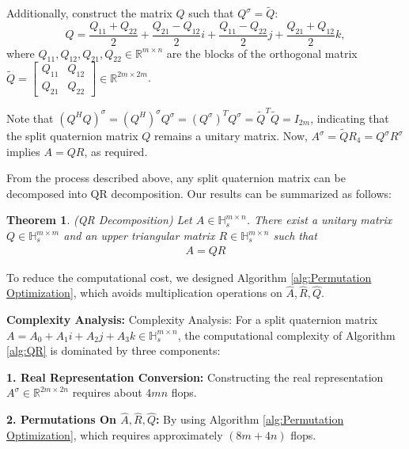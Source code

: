 \documentclass[1p]{elsarticle}
\newtheorem{theorem}{Theorem}[section]
\numberwithin{equation}{section}
\begin{document}
\begin{algorithm}[htbp]
\begin{itemize}
\begin{algorithmic}
\end{algorithmic}
\end{itemize}
\end{algorithm}

Additionally, construct the matrix $Q$ such that $Q^\sigma=\widetilde{Q}:$
$$
Q = \frac{Q_{11} + Q_{22}}{2} + \frac{Q_{21} - Q_{12}}{2}i + \frac{Q_{11} - Q_{22}}{2}j + \frac{Q_{21} + Q_{12}}{2}k,
$$
where  $Q_{11}, 
 Q_{12}, Q_{21}, Q_{22} \in \mathbb{R}^{m \times n}$ are the blocks of the orthogonal matrix $\widetilde{Q} = \begin{bmatrix} Q_{11} & Q_{12} \\ Q_{21} & Q_{22} \end{bmatrix} \in \mathbb{
 R}^{2m \times 2m}$.

Note that $(Q^H Q)^\sigma = {(Q^H)}^\sigma Q^\sigma = {(Q^\sigma)}^TQ^\sigma = \widetilde{Q}^T\widetilde{Q} = I_{2m}$, indicating that the split quaternion matrix $Q$ remains a unitary matrix.
Now, $A^\sigma=\widetilde{Q}R_4=Q^\sigma R^\sigma$ implies
$A = Q R$, as required.

From the process described above,  any split quaternion matrix can be decomposed into QR decomposition. Our results can be summarized as follows:
\begin{theorem}(QR Decomposition)
    Let $A \in \mathbb{H}_s^{m \times n}$. There exist a unitary matrix $Q \in \mathbb{H}_s^{m \times m}$ and an upper triangular matrix $R \in \mathbb{H}_s^{m \times n}$ such that
    \begin{eqnarray}\label{eq:split QR}
        A = Q R
    \end{eqnarray}
\end{theorem}


To reduce the computational cost, we designed Algorithm \ref{alg:Permutation Optimization}, which avoids multiplication operations on $\widehat{A}, \widehat{R}, \widehat{Q}$.

\textbf{Complexity Analysis:}
{Complexity Analysis:} For a split quaternion matrix $A = A_0 + A_1i + A_2j + A_3k \in \mathbb{H}_s^{m \times n}$, the computational complexity of Algorithm \ref{alg:QR} is dominated by three components:  

\textbf{1. Real Representation Conversion:}
Constructing the real representation $A^\sigma \in \mathbb{R}^{2m \times 2n}$ requires about $4mn$ flops. 

\textbf{2. Permutations On $\widehat{A}, \widehat{R}, \widehat{Q}$:}
By using Algorithm \ref{alg:Permutation Optimization},  which requires approximately  $(8m+4n)$ flops.
\end{document}
